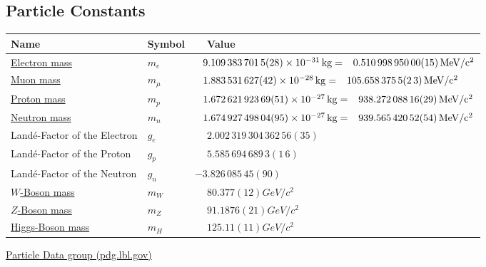 	\subsection{Particle Constants}
		\label{Sec:ParticleConstants}
		\begin{center}
			\begin{tabular}{| L{.35\textwidth} L{.15\textwidth} L{.4\textwidth} |}
				\hline Name & Symbol & $\phantom{-}$Value \\ \hline \hline
				\href{https://en.wikipedia.org/wiki/Electron_mass}{Electron mass} & $m_e$ &
				$\phantom{-}9.109\,383\,701\,5(28)\times 10^{-31}\,\mathrm{kg} =
					\phantom{-}0.510\,998\,950\,00(15)\,\mathrm{MeV/c^2}$ \\ \hline
				\href{https://en.wikipedia.org/wiki/Muon}{Muon mass} & $m_\mu$ &
				$\phantom{-}1.883\,531\,627(42)\times 10^{-28}\,\mathrm{kg} =
					\phantom{-}105.658\,375\,5(2\,3)\,\mathrm{MeV/c^2}$ \\ \hline
				\href{https://en.wikipedia.org/wiki/Proton}{Proton mass} & $m_p$ &
				$\phantom{-}1.672\,621\,923\,69(51)\times 10^{-27}\,\mathrm{kg} =
					\phantom{-}938.272\,088\,16(29)\,\mathrm{MeV/c^2}$ \\ \hline
				\href{https://en.wikipedia.org/wiki/Neutron}{Neutron mass} & $m_n$ &
				$\phantom{-}1.674\,927\,498\, 04(95)\times 10^{-27}\,\mathrm{kg} =
					\phantom{-}939.565\,420\,52(54)\,\mathrm{MeV/c^2}$ \\ \hline
				Landé-Factor of the Electron & $g_e$ &
				$\phantom{-}2.002\,319\,304\,362\,56(35)$ \\ \hline
				Landé-Factor of the Proton & $g_p$ &
				$\phantom{-}5.585\,694\,689\,3(1\,6)$ \\ \hline
				Landé-Factor of the Neutron & $g_n$ &
				$- 3.826\,085\,45(90)$ \\ \hline
				\href{https://en.wikipedia.org/wiki/W_and_Z_bosons#W_bosons}{$W$-Boson mass} & $m_W$ &
				$\phantom{-}80.377(12)\unit{GeV/c^2}$ \\ \hline
				\href{https://en.wikipedia.org/wiki/W_and_Z_bosons#W_bosons}{$Z$-Boson mass} & $m_Z$ &
				$\phantom{-}91.1876(21)\unit{GeV/c^2}$ \\ \hline
				\href{https://en.wikipedia.org/wiki/Higgs_boson}{Higgs-Boson mass} & $m_H$ &
				$\phantom{-}125.11(11)\unit{GeV/c^2}$ \\ \hline
			\end{tabular}
		\end{center}

		\href{https://pdg.lbl.gov/}{Particle Data group (pdg.lbl.gov)}


